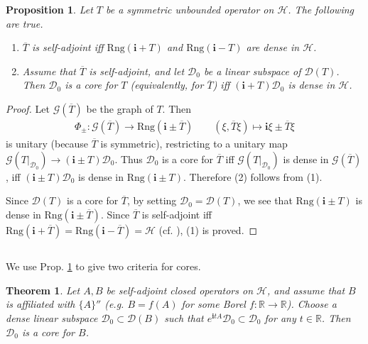 \documentclass[12pt,b5paper,notitlepage]{article}
\theoremstyle{definition}
\theoremstyle{plain}
\newtheorem{thm}[df]{Theorem}
\newtheorem{pp}[df]{Proposition}
\newcommand{\mc}{\mathcal}
\newcommand{\ovl}{\overline}
\newcommand{\Dom}{\scr{D}}
\newcommand{\scr}{\mathscr}
\newcommand{\im}{\mathbf{i}}
\newcommand{\Rbb}{\mathbb R}
\newcommand{\Rng}{\mathrm{Rng}}
\numberwithin{equation}{section}
\begin{document}
\begin{pp}\label{lb31}
Let $T$ be a symmetric unbounded operator on $\mc H$. The following are true.
\begin{enumerate}[label=(\arabic*)]
\item $\ovl T$ is self-adjoint iff $\Rng(\im+T)$ and $\Rng(\im-T)$ are dense in $\mc H$.
\item Assume that $\ovl T$ is self-adjoint, and let $\Dom_0$ be a linear subspace of $\Dom(T)$. Then $\Dom_0$ is a core for $T$ (equivalently, for $\ovl T$) iff $(\im+T)\Dom_0$ is dense in $\mc H$.
\end{enumerate}
\end{pp}

\begin{proof}
Let $\scr G(\ovl T)$ be the graph of $T$. Then
\begin{align*}
\Phi_\pm: \scr G(\ovl T)\rightarrow \Rng(\im\pm\ovl T)\qquad (\xi,\ovl T\xi)\mapsto \im\xi\pm\ovl T\xi
\end{align*}
is unitary (because $\ovl T$ is symmetric), restricting to a unitary map $\scr G(T|_{\Dom_0})\rightarrow (\im\pm T)\Dom_0$. Thus $\Dom_0$ is a core for $\ovl T$ iff $\scr G(T|_{\Dom_0})$ is dense in $\scr G(\ovl T)$, iff $(\im\pm T)\Dom_0$ is dense in $\Rng(\im\pm T)$. Therefore (2) follows from (1).

Since $\Dom(T)$ is a core for $\ovl T$, by setting $\Dom_0=\Dom(T)$, we see that $\Rng(\im\pm T)$ is dense in $\Rng(\im\pm\ovl T)$. Since $\ovl T$ is self-adjoint iff $\Rng(\im+\ovl T)=\Rng(\im-\ovl T)=\mc H$ (cf. \cite[Sec. 10]{Gui-S}), (1) is proved.
\end{proof}





\subsection{}

We use Prop. \ref{lb31} to give two criteria for cores.


\begin{thm}\label{lb58}
Let $A,B$ be self-adjoint closed operators on $\mc H$, and assume that $B$ is affiliated with $\{A\}''$ (e.g. $B=f(A)$ for some Borel $f:\Rbb\rightarrow\Rbb$). Choose a dense linear subspace $\Dom_0\subset\Dom(B)$ such that $e^{\im tA}\Dom_0\subset\Dom_0$ for any $t\in\Rbb$. Then $\Dom_0$ is a core for $B$.
\end{thm}
\end{document}

